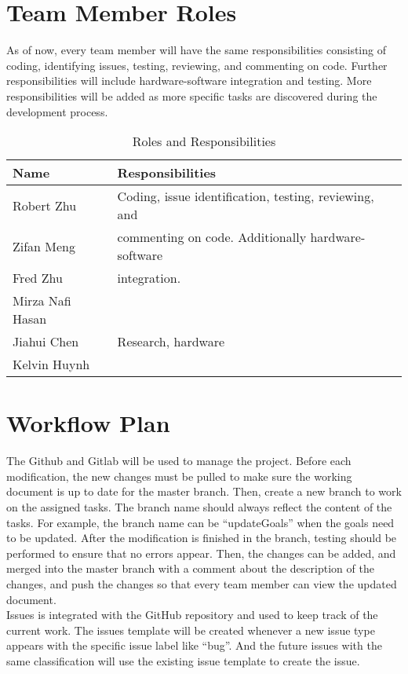 \documentclass{article}
\begin{document}
\section{Team Member Roles}

As of now, every team member will have the same responsibilities consisting of coding,
identifying issues, testing, reviewing, and commenting on code. Further responsibilities
will include hardware-software integration and testing. More responsibilities will be
added as more specific tasks are discovered during the development process.

\begin{table}[H]
\caption{Roles and Responsibilities} \label{TblRoles}
\begin{tabularx}{\textwidth}{ll}
\toprule
\textbf{Name} & \textbf{Responsibilities}\\
\midrule
Robert Zhu & Coding, issue identification, testing, reviewing, and \\
Zifan Meng & commenting on code. Additionally hardware-software \\
Fred Zhu & integration. \\
Mirza Nafi Hasan & \\
Jiahui Chen & Research, hardware\\
Kelvin Huynh & \\
\bottomrule
\end{tabularx}
\end{table}

\section{Workflow Plan}

The Github and Gitlab will be used to manage the project. Before each modification, the new changes
must be pulled to make sure the working document is up to date for the master branch. Then, create
a new branch to work on the assigned tasks. The branch name should always reflect the content of the
tasks. For example, the branch name can be “updateGoals” when the goals need to be updated. After
the modification is finished in the branch, testing should be performed to ensure that no errors appear.
Then, the changes can be added, and merged into the master branch with a comment about the description
of the changes, and push the changes so that every team member can view the updated document.\\ Issues is
integrated with the GitHub repository and used to keep track of the current work. The issues template will
be created whenever a new issue type appears with the specific issue label like “bug”. And the future
issues with the same classification will use the existing issue template to create the issue.
\end{document}
